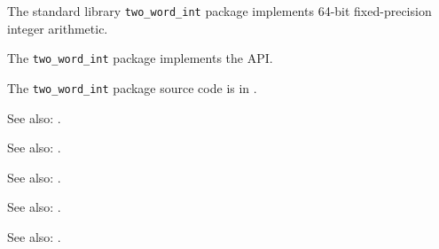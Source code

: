 
The standard library {\tt two\_word\_int} package implements 64-bit fixed-precision integer arithmetic.

The {\tt two\_word\_int} package implements the  API.

The {\tt two\_word\_int} package source code is in .

See also:  .

See also:  .

See also:  .

See also:  .

See also:  .





